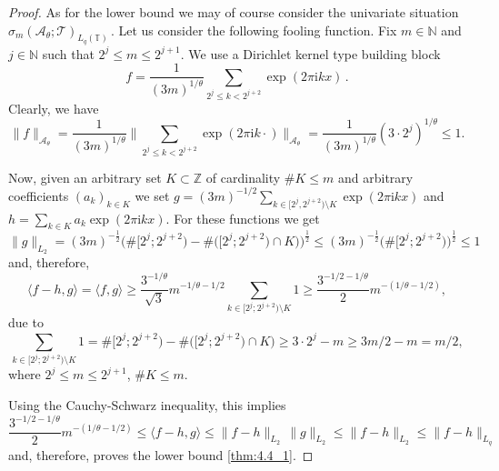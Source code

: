 \documentclass[11pt,reqno]{article}
\numberwithin{equation}{section}
\theoremstyle{definition}
\theoremstyle{plain}
\newcommand{\N}{\ensuremath{\mathbb{N}}}
\newcommand{\zz}{\ensuremath{\mathbb{Z}}}
\newcommand{\tor}{\ensuremath{\mathbb{T}}}
\newcommand{\ca}{\ensuremath{\mathcal A}}
\begin{document}
\begin{proof}
As for the lower bound we may of course consider the univariate situation $
\sigma_{m}(\ca_\theta;\mathcal{T})_{L_q(\tor)}\,.$ Let us consider the following fooling function. Fix $m\in \N$ and $j \in \N$ such that $2^j \leq m \leq 2^{j+1}$. We use a Dirichlet kernel type building block  
$$
 f = \frac{1}{(3m)^{1/\theta}} \sum\limits_{2^j \leq k < 2^{j+2}} \exp(2\pi \mathrm{i} kx)\,.
$$
Clearly, we have  
 $$
 \|f\|_{\ca_\theta} 
 = \frac{1}{(3m)^{1/\theta}} \bigg\|\sum\limits_{2^j \leq k < 2^{j+2}} \exp(2\pi \mathrm{i} k\cdot)\bigg\|_{\ca_\theta} 
 = \frac{1}{(3m)^{1/\theta}} (3\cdot 2^j)^{1/\theta} \leq 1 .
 $$

Now, given an arbitrary set \(K \subset \zz\) of cardinality \(\# K \leq m\) and arbitrary coefficients \((a_k)_{k \in K}\) we set \(g =   (3m)^{-1/2} \sum_{k \in [2^j, 2^{j+2}) \setminus K} \exp(2 \pi \mathrm{i} k x) \) and \(h =  \sum_{k \in K} a_{k} \exp(2 \pi \mathrm{i} k x)\). For these functions we get
 \begin{equation} \label{hup}
\|g\|_{L_2} 
=  (3m)^{-\frac{1}{2}} \big(\#[2^j;  2^{j+2}) - \# \big( [2^j;  2^{j+2}) \cap K \big) \big)^{\frac{1}{2}} 
\leq (3m)^{-\frac{1}{2}} \big(\#[2^j;  2^{j+2})\big)^{\frac{1}{2}} 
 \leq 1
 \end{equation} 
 and, therefore, 
 \begin{equation}  \label{tangle}
 \langle f-h,g \rangle  = \langle f,g \rangle 
 \geq \frac{3^{-1/\theta}}{\sqrt{3}} m^{-1/\theta-1/2} \sum_{k \in  [2^j;  2^{j+2})  \setminus K} 1 
 \geq  \frac{3^{-1/2-1/\theta}}{2} m^{-(1/\theta-1/2)} ,
 \end{equation}
 due to 
 \begin{equation} \label{2^j;2^j+2_setminus_K}
 \sum_{k \in  [2^j;  2^{j+2})  \setminus K} 1
 =
 \# [2^j;  2^{j+2}) - \# \big( [2^j;  2^{j+2}) \cap K \big)  \geq 3\cdot 2^j - m \geq 3m/2 - m = m/2 ,
 \end{equation}  
where $2^j \leq m \leq 2^{j+1}$, \(\# K \leq m\). 

 Using the Cauchy-Schwarz inequality, this implies 
  \begin{equation} 
  \frac{3^{-1/2-1/\theta}}{2} m^{-(1/\theta-1/2)} \leq \langle f-h,g \rangle \leq \|f - h\|_{L_2}\, \|g\|_{L_2} \leq \|f - h\|_{L_2}
  \leq \|f - h\|_{L_q}
 \end{equation}
and, therefore, proves  the lower bound  \eqref{thm:4.4_1}. 
\end{proof}
\end{document}
